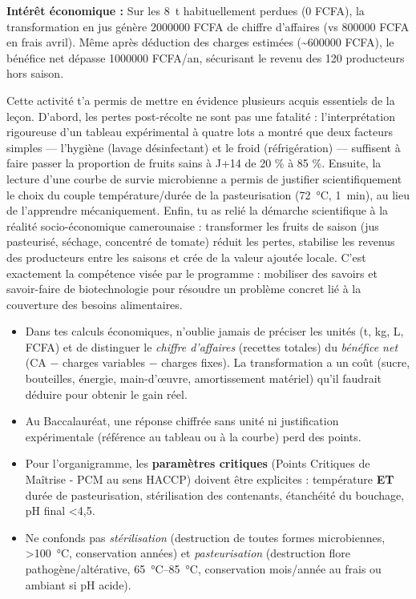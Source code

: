 \documentclass[11pt]{article}
\newcommand{\cle}[1]{{\popxbold\color{popdark}#1}}
\newcounter{popsec}
\newcounter{popsub}
\newcommand{\courssub}[1]{%
  \stepcounter{popsub}%
  \par\vspace{9pt}\noindent{\popxbold\fontsize{11.5}{13}\selectfont\color{popink}{\color{poporange}\thepopsec.\thepopsub}\hspace{6pt}#1}\par\nopagebreak\vspace{4pt}
}
\begin{document}
\begin{exoresolu}
\textbf{Intérêt économique :} Sur les \SI{8}{t} habituellement perdues (0 FCFA), la transformation en jus génère \num{2000000} FCFA de chiffre d'affaires (vs \num{800000} FCFA en frais avril). Même après déduction des charges estimées (\textasciitilde \num{600000} FCFA), le bénéfice net dépasse \num{1000000} FCFA/an, sécurisant le revenu des 120 producteurs hors saison.
\end{exoresolu}

\courssub{Bilan de l'activité}

Cette activité t'a permis de mettre en évidence plusieurs acquis essentiels de la leçon. D'abord, les pertes post-récolte ne sont pas une fatalité : l'interprétation rigoureuse d'un tableau expérimental à quatre lots a montré que deux facteurs simples — l'\cle{hygiène} (lavage désinfectant) et le \cle{froid} (réfrigération) — suffisent à faire passer la proportion de fruits sains à J+14 de 20 \% à 85 \%. Ensuite, la lecture d'une courbe de survie microbienne a permis de justifier scientifiquement le choix du couple température/durée de la \cle{pasteurisation} (\SI{72}{\celsius}, \SI{1}{min}), au lieu de l'apprendre mécaniquement. Enfin, tu as relié la démarche scientifique à la réalité socio-économique camerounaise : transformer les fruits de saison (jus pasteurisé, séchage, concentré de tomate) réduit les pertes, stabilise les revenus des producteurs entre les saisons et crée de la valeur ajoutée locale. C'est exactement la compétence visée par le programme : mobiliser des savoirs et savoir-faire de biotechnologie pour résoudre un problème concret lié à la couverture des besoins alimentaires.

\begin{attention}
\begin{itemize}
\item Dans tes calculs économiques, n'oublie jamais de préciser les unités (t, kg, L, FCFA) et de distinguer le \emph{chiffre d'affaires} (recettes totales) du \emph{bénéfice net} (CA $-$ charges variables $-$ charges fixes). La transformation a un coût (sucre, bouteilles, énergie, main-d'œuvre, amortissement matériel) qu'il faudrait déduire pour obtenir le gain réel.
\item Au Baccalauréat, une réponse chiffrée sans unité ni justification expérimentale (référence au tableau ou à la courbe) perd des points.
\item Pour l'organigramme, les \textbf{paramètres critiques} (Points Critiques de Maîtrise - PCM au sens HACCP) doivent être explicites : température \textbf{ET} durée de pasteurisation, stérilisation des contenants, étanchéité du bouchage, pH final \textless 4,5.
\item Ne confonds pas \emph{stérilisation} (destruction de toutes formes microbiennes, \textgreater \SI{100}{\celsius}, conservation années) et \emph{pasteurisation} (destruction flore pathogène/altérative, \SIrange{65}{85}{\celsius}, conservation mois/année au frais ou ambiant si pH acide).
\end{itemize}
\end{attention}
\end{document}
